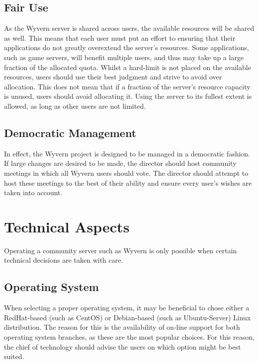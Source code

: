 \documentclass[a4paper]{article}
\begin{document}
\subsection{Fair Use}
As the Wyvern server is shared across users, the available resources will be shared as well. This means that each user must put an effort to ensuring that their applications do not greatly overextend the server's resources. Some applications, such as game servers, will benefit multiple users, and thus may take up a large fraction of the allocated quota. Whilst a hard-limit is not placed on the available resources, users should use their best judgment and strive to avoid over allocation. This does not mean that if a fraction of the server's resource capacity is unused, users should avoid allocating it. Using the server to its fullest extent is allowed, as long as other users are not limited.

\subsection{Democratic Management}
In effect, the Wyvern project is designed to be managed in a democratic fashion. If large changes are desired to be made, the director should host community meetings in which all Wyvern users should vote. The director should attempt to host these meetings to the best of their ability and ensure every user's wishes are taken into account.

\section{Technical Aspects}
\label{sec:technical}
Operating a community server such as Wyvern is only possible when certain technical decisions are taken with care.

\subsection{Operating System}
When selecting a proper operating system, it may be beneficial to chose either a RedHat-based (such as CentOS) or Debian-based (such as Ubuntu-Server) Linux distribution. The reason for this is the availability of on-line support for both operating system branches, as these are the most popular choices. For this reason, the chief of technology should advise the users on which option might be best suited.
\end{document}
